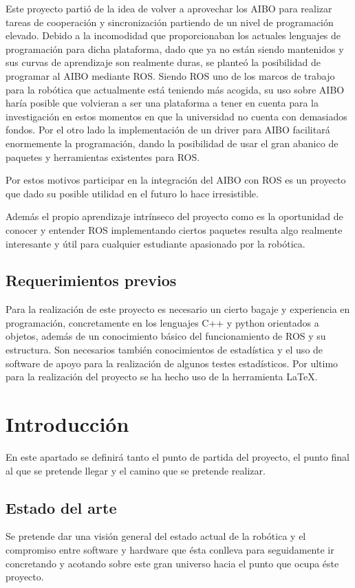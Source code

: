 \documentclass[12pt,a4paper,final,twoside]{article}
\begin{document}
Este proyecto partió de la idea de volver a aprovechar los AIBO para realizar tareas de cooperación y sincronización partiendo de un nivel de programación elevado. Debido a la incomodidad que proporcionaban los actuales lenguajes de programación para dicha plataforma, dado que ya no están siendo mantenidos y sus curvas de aprendizaje son realmente duras,   se planteó la posibilidad de programar al AIBO mediante ROS\cite{ros}.
Siendo ROS uno de los marcos de trabajo para la robótica que actualmente está teniendo más acogida, su uso sobre AIBO haría posible que volvieran a ser una plataforma a tener en cuenta para la investigación en estos momentos en que la universidad no cuenta con demasiados fondos. Por el otro lado la implementación de un driver para AIBO facilitará enormemente la programación, dando la posibilidad de usar el gran abanico de paquetes y herramientas existentes para ROS.

Por estos motivos participar en la integración del AIBO con ROS es un proyecto que dado su posible utilidad en el futuro lo hace irresistible.

Además el propio aprendizaje intrínseco del proyecto como es la oportunidad de conocer y entender ROS implementando ciertos paquetes resulta algo realmente interesante y útil para cualquier estudiante apasionado por la robótica.


\subsection{Requerimientos previos}
Para la realización de este proyecto es necesario un cierto bagaje y experiencia en programación, concretamente en los lenguajes C++ y python orientados a objetos, además de un conocimiento básico del funcionamiento de ROS y su estructura.
Son necesarios también conocimientos de estadística y el uso de software de apoyo para la realización de algunos testes estadísticos.
Por ultimo para la realización del proyecto se ha hecho uso de la herramienta \LaTeX. 
\newpage
\clearpage

\section{Introducción}
En este apartado se definirá tanto el punto de partida del proyecto, el punto final al que se pretende llegar y el camino que se pretende realizar. 
 
\subsection{Estado del arte}\label{estatdelart}
Se pretende dar una visión general del estado actual de la robótica y el compromiso entre software y hardware que ésta conlleva para seguidamente ir concretando y acotando sobre este gran universo hacia el punto que ocupa éste proyecto. 
\end{document}
